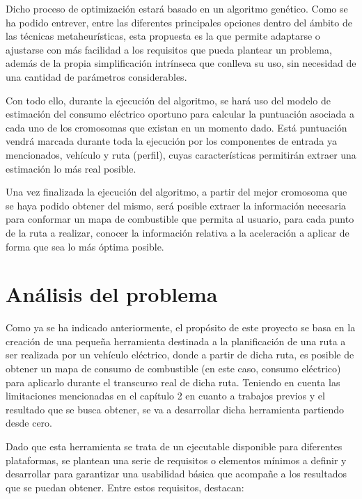 \documentclass[11pt,spanish,listoffigures,listoftables]{tfgetsinf}
\begin{document}
Dicho proceso de optimización estará basado en un algoritmo genético. Como se ha podido entrever, entre las diferentes principales opciones dentro del ámbito de las técnicas metaheurísticas, esta propuesta es la que permite adaptarse o ajustarse con más facilidad a los requisitos que pueda plantear un problema, además de la propia simplificación intrínseca que conlleva su uso, sin necesidad de una cantidad de parámetros considerables.

Con todo ello, durante la ejecución del algoritmo, se hará uso del modelo de estimación del consumo eléctrico oportuno para calcular la puntuación asociada a cada uno de los cromosomas que existan en un momento dado. Está puntuación vendrá marcada durante toda la ejecución por los componentes de entrada ya mencionados, vehículo y ruta (perfil), cuyas características permitirán extraer una estimación lo más real posible.

Una vez finalizada la ejecución del algoritmo, a partir del mejor cromosoma que se haya podido obtener del mismo, será posible extraer la información necesaria para conformar un mapa de combustible que permita al usuario, para cada punto de la ruta a realizar, conocer la información relativa a la aceleración a aplicar de forma que sea lo más óptima posible.


\chapter{Análisis del problema}
\label{AnalisisProblema}
Como ya se ha indicado anteriormente, el propósito de este proyecto se basa en la creación de una pequeña herramienta destinada a la planificación de una ruta a ser realizada por un vehículo eléctrico, donde a partir de dicha ruta, es posible de obtener un mapa de consumo de combustible (en este caso, consumo eléctrico) para aplicarlo durante el transcurso real de dicha ruta. Teniendo en cuenta las limitaciones mencionadas en el capítulo 2 en cuanto a trabajos previos y el resultado que se busca obtener, se va a desarrollar dicha herramienta partiendo desde cero.

Dado que esta herramienta se trata de un ejecutable disponible para diferentes plataformas, se plantean una serie de requisitos o elementos mínimos a definir y desarrollar para garantizar una usabilidad básica que acompañe a los resultados que se puedan obtener. Entre estos requisitos, destacan:
\end{document}
